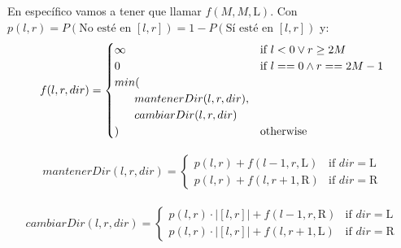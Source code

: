 \documentclass[../main.tex]{subfiles}
\begin{document}
\begin{frame}
  \frametitle{\SECTIONB}
  \framesubtitle{\EJB}

  En específico vamos a tener que llamar \(f(M, M, \text{L})\). Con \(p(l, r) = P(\text{No esté en } [l, r]) = 1 - P(\text{Sí esté en } [l, r])\) y:
  \begin{gather*}
    f(l, r, dir) = \begin{cases}
      \infty & \text{if } l < 0 \lor r \geq 2M \\
      0 & \text{if } l == 0 \land r == 2M-1 \\
      min( \\
      \tab mantenerDir(l, r, dir), \\
      \tab cambiarDir(l, r, dir) \\
      ) & \text{otherwise}
    \end{cases}
  \end{gather*}

  \begin{gather*}
    mantenerDir(l, r, dir) = \begin{cases}
      p(l, r) + f(l-1, r, \text{L}) & \text{if } dir = \text{L} \\
      p(l, r) + f(l, r+1, \text{R}) & \text{if } dir = \text{R}
    \end{cases}
  \end{gather*}

  \begin{gather*}
    cambiarDir(l, r, dir) = \begin{cases}
      p(l, r) \cdot |[l, r]| + f(l-1, r, \text{R}) & \text{if } dir = \text{L} \\
      p(l, r) \cdot |[l, r]| + f(l, r+1, \text{L}) & \text{if } dir = \text{R}
    \end{cases}
  \end{gather*}
\end{frame}
\end{document}
